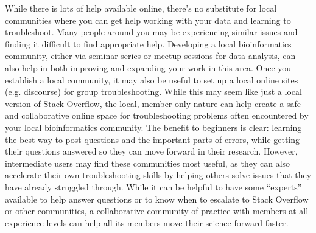 \documentclass[10pt,letterpaper]{article}
\begin{document}
While there is lots of help available online, there’s no substitute for local communities where you can get help working with your data and learning to troubleshoot. Many people around you may be experiencing similar issues and finding it difficult to find appropriate help. Developing a local bioinformatics community, either via seminar series or meetup sessions for data analysis, can also help in both improving and expanding your work in this area. Once you establish a local community, it may also be useful to set up a local online sites (e.g. discourse) for group troubleshooting. While this may seem like just a local version of Stack Overflow, the local, member-only nature can help create a safe and collaborative online space for troubleshooting problems often encountered by your local bioinformatics community. The benefit to beginners is clear: learning the best way to post questions and the important parts of errors, while getting their questions answered so they can move forward in their research. However, intermediate users may find these communities most useful, as they can also accelerate their own troubleshooting skills by helping others solve issues that they have already struggled through. While it can be helpful to have some “experts” available to help answer questions or to know when to escalate to Stack Overflow or other communities, a collaborative community of practice with members at all experience levels can help all its members move their science forward faster.




\end{document}

